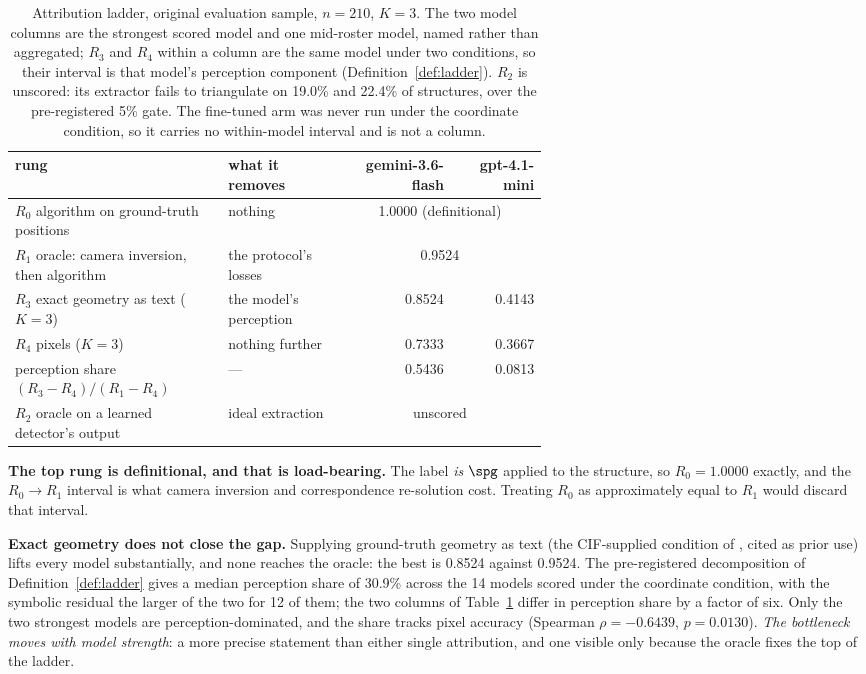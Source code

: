 \begin{table}[t]
\centering
\caption{Attribution ladder, original evaluation sample, $n=210$, $K{=}3$. The two model columns are the
strongest scored model and one mid-roster model, named rather than aggregated; $R_3$ and $R_4$ within
a column are the same model under two conditions, so their interval is that model's perception component
(Definition~\ref{def:ladder}). $R_2$ is unscored: its extractor fails to triangulate on 19.0\% and 22.4\%
of structures, over the pre-registered 5\% gate. The fine-tuned arm was never run under the coordinate
condition, so it carries no within-model interval and is not a column.}
\label{tab:rungs}
\small
\setlength{\tabcolsep}{4.5pt}
\begin{tabular}{p{0.40\linewidth}p{0.22\linewidth}rr}
\toprule
rung & what it removes & \small gemini-3.6-flash & \small gpt-4.1-mini \\
\midrule
$R_0$ algorithm on ground-truth positions & nothing & \multicolumn{2}{c}{1.0000 (definitional)} \\
$R_1$ oracle: camera inversion, then algorithm & the protocol's losses & \multicolumn{2}{c}{0.9524} \\
$R_3$ exact geometry as text ($K{=}3$) & the model's perception & 0.8524 & 0.4143 \\
$R_4$ pixels ($K{=}3$) & nothing further & 0.7333 & 0.3667 \\
\midrule
perception share $(R_3-R_4)/(R_1-R_4)$ & --- & 0.5436 & 0.0813 \\
$R_2$ oracle on a learned detector's output & ideal extraction & \multicolumn{2}{c}{unscored} \\
\bottomrule
\end{tabular}
\end{table}

\textbf{The top rung is definitional, and that is load-bearing.} The label \emph{is} $\spg$ applied to the
structure, so $R_0 = 1.0000$ exactly, and the $R_0 \to R_1$ interval is what camera inversion and
correspondence re-solution cost. Treating $R_0$ as approximately equal to $R_1$ would discard that
interval.

\textbf{Exact geometry does not close the gap.} Supplying ground-truth geometry as text (the CIF-supplied
condition of \citet{xcrys2506}, cited as prior use) lifts every model substantially, and none reaches the
oracle: the best is 0.8524 against 0.9524. The pre-registered decomposition of Definition~\ref{def:ladder}
gives a median perception share of 30.9\% across the 14 models scored under the coordinate condition, with
the symbolic residual the larger of the two for 12 of them; the two columns of Table~\ref{tab:rungs} differ
in perception share by a factor of six. Only the two strongest models are perception-dominated, and the
share tracks pixel accuracy (Spearman $\rho = -0.6439$, $p = 0.0130$). \emph{The bottleneck moves with
model strength}: a more precise statement than either single attribution, and one visible only because the
oracle fixes the top of the ladder.

